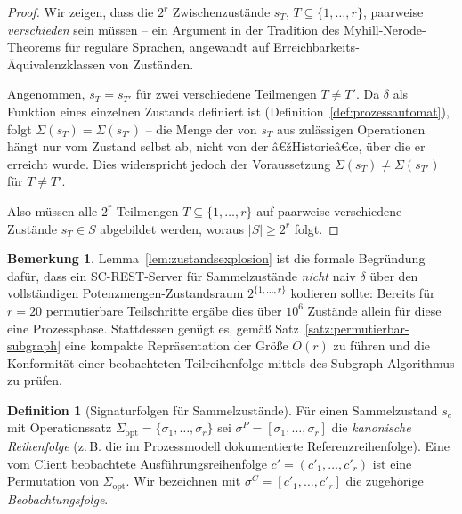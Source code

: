 ﻿\documentclass[a4paper,12pt]{article}
\theoremstyle{definition}
\newtheorem{definition}{Definition}
\newtheorem{bemerkung}{Bemerkung}
\begin{document}
\begin{proof}
	Wir zeigen, dass die $2^r$ Zwischenzustände $s_T$, $T \subseteq \{1,\ldots,r\}$,
	paarweise \emph{verschieden} sein müssen -- ein Argument in der Tradition des
	Myhill-Nerode-Theorems für reguläre Sprachen, angewandt auf
	Erreichbarkeits-Äquivalenzklassen von Zuständen.

	Angenommen, $s_T = s_{T'}$ für zwei verschiedene Teilmengen $T \neq T'$. Da $\delta$
	als Funktion eines einzelnen Zustands definiert ist
	(Definition~\ref{def:prozessautomat}), folgt $\Sigma(s_T) = \Sigma(s_{T'})$ -- die
	Menge der von $s_T$ aus zulässigen Operationen hängt nur vom Zustand selbst ab, nicht
	von der â€žHistorieâ€œ, über die er erreicht wurde. Dies widerspricht jedoch der
	Voraussetzung $\Sigma(s_T) \neq \Sigma(s_{T'})$ für $T \neq T'$.

	Also müssen alle $2^r$ Teilmengen $T \subseteq \{1,\ldots,r\}$ auf paarweise
	verschiedene Zustände $s_T \in S$ abgebildet werden, woraus $|S| \geq 2^r$ folgt.
	\qedhere
\end{proof}

\begin{bemerkung}
	Lemma~\ref{lem:zustandsexplosion} ist die formale Begründung dafür, dass ein
	SC-REST-Server für Sammelzustände \emph{nicht} naiv $\delta$ über den vollständigen
	Potenzmengen-Zustandsraum $2^{\{1,\ldots,r\}}$ kodieren sollte: Bereits für $r=20$
	permutierbare Teilschritte ergäbe dies über $10^6$ Zustände allein für diese eine
	Prozessphase. Stattdessen genügt es, gemäß Satz~\ref{satz:permutierbar-subgraph} eine
	kompakte Repräsentation der Größe $O(r)$ zu führen und die Konformität einer
	beobachteten Teilreihenfolge mittels des Subgraph Algorithmus zu prüfen.
\end{bemerkung}

\begin{definition}[Signaturfolgen für Sammelzustände]
	\label{def:signaturfolge-sammel}
	Für einen Sammelzustand $s_c$ mit Operationssatz
	$\Sigma_{\mathrm{opt}}=\{\sigma_1,\ldots,\sigma_r\}$ sei $\sigma^P =
	[\sigma_1,\ldots,\sigma_r]$ die \emph{kanonische Reihenfolge} (z.\,B. die im
	Prozessmodell dokumentierte Referenzreihenfolge). Eine vom Client beobachtete
	Ausführungsreihenfolge $c' = (c'_1,\ldots,c'_r)$ ist eine Permutation von
	$\Sigma_{\mathrm{opt}}$. Wir bezeichnen mit $\sigma^{C}=[c'_1,\ldots,c'_r]$ die
	zugehörige \emph{Beobachtungsfolge}.
\end{definition}
\end{document}
